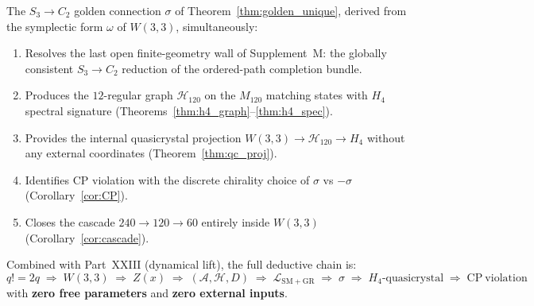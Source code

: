 \begin{tcolorbox}[colback=yellow!4!white,colframe=orange!75!black,
  title=\textbf{Part~XXIV Closure Theorem}]
\begin{theorem}
\label{thm:xxiv_closure}
The $S_3\to C_2$ golden connection $\sigma$ of
Theorem~\ref{thm:golden_unique}, derived from the symplectic form
$\omega$ of $W(3,3)$, simultaneously:
\begin{enumerate}[nosep]
  \item Resolves the last open finite-geometry wall of Supplement~M:
        the globally consistent $S_3\to C_2$ reduction of the
        ordered-path completion bundle.
  \item Produces the $12$-regular graph $\mathcal{H}_{120}$ on the
        $M_{120}$ matching states with $H_4$ spectral signature
        (Theorems~\ref{thm:h4_graph}--\ref{thm:h4_spec}).
  \item Provides the internal quasicrystal projection
        $W(3,3)\to\mathcal{H}_{120}\to H_4$ without any external
        coordinates (Theorem~\ref{thm:qc_proj}).
  \item Identifies CP violation with the discrete chirality choice of
        $\sigma$ vs $-\sigma$ (Corollary~\ref{cor:CP}).
  \item Closes the cascade $240\to 120\to 60$ entirely inside
        $W(3,3)$ (Corollary~\ref{cor:cascade}).
\end{enumerate}
Combined with Part~XXIII (dynamical lift), the full deductive chain is:
\[
  q!=2q
  \;\Rightarrow\; W(3,3)
  \;\Rightarrow\; Z(x)
  \;\Rightarrow\; (\mathcal{A},\mathcal{H},D)
  \;\Rightarrow\; \mathcal{L}_{\mathrm{SM+GR}}
  \;\Rightarrow\; \sigma
  \;\Rightarrow\; H_4\text{-quasicrystal}
  \;\Rightarrow\; \mathrm{CP\ violation}
\]
with \textbf{zero free parameters} and \textbf{zero external inputs}.
\end{theorem}
\end{tcolorbox}
